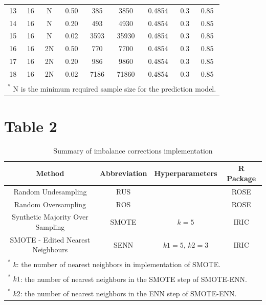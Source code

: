 \documentclass[
]{article}
\begin{document}
\begin{table}[!h]
\begin{tabular}[t]{ccccccccc}
13 & 16 & N & 0.50 & 385 & 3850 & 0.4854 & 0.3 & 0.85\\
  
14 & 16 & N & 0.20 & 493 & 4930 & 0.4854 & 0.3 & 0.85\\
  
15 & 16 & N & 0.02 & 3593 & 35930 & 0.4854 & 0.3 & 0.85\\
  
16 & 16 & 2N & 0.50 & 770 & 7700 & 0.4854 & 0.3 & 0.85\\
  
17 & 16 & 2N & 0.20 & 986 & 9860 & 0.4854 & 0.3 & 0.85\\
  
18 & 16 & 2N & 0.02 & 7186 & 71860 & 0.4854 & 0.3 & 0.85\\
\bottomrule
\multicolumn{9}{l}{\rule{0pt}{1em}\textsuperscript{*} N is the minimum required sample size for the prediction model.}\\
\end{tabular}
\end{table}

\newpage

\hypertarget{table-2}{%
\section{Table 2}\label{table-2}}

\begin{table}[!h]

\caption{\label{tab:tab:table}Summary of imbalance corrections implementation}
\centering
\begin{tabular}[t]{cccc}
\toprule
Method & Abbreviation & Hyperparameters & R Package\\
\midrule
Random Undesampling & RUS &  & ROSE \cite{rose}\\
\addlinespace
Random Oversampling & ROS &  & ROSE \cite{rose}\\
\addlinespace
Synthetic Majority Over Sampling & SMOTE & $k=5$ & IRIC \cite{iric}\\
\addlinespace
SMOTE - Edited Nearest Neighbours & SENN & $k1=5$, $k2 = 3$ & IRIC \cite{iric}\\
\bottomrule
\multicolumn{4}{l}{\rule{0pt}{1em}\textsuperscript{*}      $k$: the number of nearest neighbors in implementation of SMOTE.}\\
\multicolumn{4}{l}{\rule{0pt}{1em}\textsuperscript{*}     $k1$: the number of nearest neighbors in the SMOTE step of SMOTE-ENN.}\\
\multicolumn{4}{l}{\rule{0pt}{1em}\textsuperscript{*}     $k2$: the number of nearest neighbors in the ENN step of SMOTE-ENN.}\\
\end{tabular}
\end{table}
\end{document}

